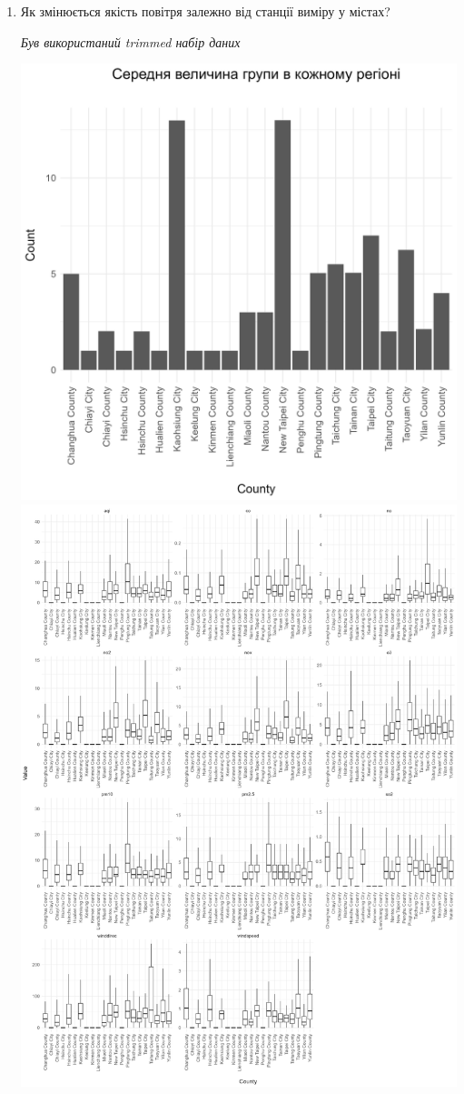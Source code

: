 \documentclass{article}
\begin{document}
\begin{enumerate}
    
    \item Як змінюється якість повітря залежно від станції виміру у містах?
    
    \quad \textit{Був використаний trimmed набір даних}

    \includegraphics[width=6in]{question7/bar-count.png}
    \includegraphics[width=6in]{question7/box-county.png}

\end{enumerate}
\end{document}
